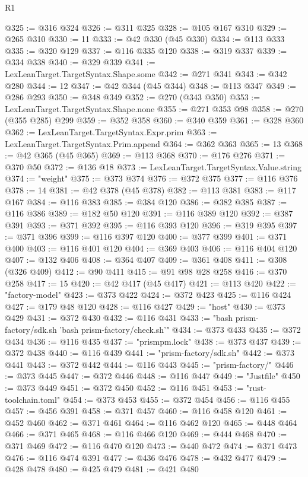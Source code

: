 \begin{lexlean}{R1}
\begin{coremodule}
@325 := @316 @324
@326 := @311 @325
@328 := @105 @167 @310
@329 := @265 @310
@330 := 11
@333 := @42 @330 (@45 @330)
@334 := @113 @333
@335 := @320 @129
@337 := @116 @335 @120
@338 := @319 @337
@339 := @334 @338
@340 := @329 @339
@341 := LexLeanTarget.TargetSyntax.Shape.some
@342 := @271 @341
@343 := @342 @280
@344 := 12
@347 := @42 @344 (@45 @344)
@348 := @113 @347
@349 := @286 @293
@350 := @348 @349
@352 := @270 (@343 @350)
@353 := LexLeanTarget.TargetSyntax.Shape.none
@355 := @271 @353 @98
@358 := @270 (@355 @285) @299
@359 := @352 @358
@360 := @340 @359
@361 := @328 @360
@362 := LexLeanTarget.TargetSyntax.Expr.prim
@363 := LexLeanTarget.TargetSyntax.Prim.append
@364 := @362 @363
@365 := 13
@368 := @42 @365 (@45 @365)
@369 := @113 @368
@370 := @176 @276
@371 := @370 @50
@372 := @136 @18
@373 := LexLeanTarget.TargetSyntax.Value.string
@374 := "weight"
@375 := @373 @374
@376 := @372 @375
@377 := @116 @376
@378 := 14
@381 := @42 @378 (@45 @378)
@382 := @113 @381
@383 := @117 @167
@384 := @116 @383
@385 := @384 @120
@386 := @382 @385
@387 := @116 @386
@389 := @182 @50 @120
@391 := @116 @389 @120
@392 := @387 @391
@393 := @371 @392
@395 := @116 @393 @120
@396 := @319 @395
@397 := @371 @396
@399 := @116 @397 @120
@400 := @377 @399
@401 := @371 @400
@403 := @116 @401 @120
@404 := @369 @403
@406 := @116 @404 @120
@407 := @132 @406
@408 := @364 @407
@409 := @361 @408
@411 := @308 (@326 @409)
@412 := @90 @411
@415 := @91 @98 @28 @258
@416 := @370 @258
@417 := 15
@420 := @42 @417 (@45 @417)
@421 := @113 @420
@422 := "factory-model"
@423 := @373 @422
@424 := @372 @423
@425 := @116 @424
@427 := @179 @48 @120
@428 := @116 @427
@429 := "host"
@430 := @373 @429
@431 := @372 @430
@432 := @116 @431
@433 := "bash prism-factory/sdk.sh 'bash prism-factory/check.sh'"
@434 := @373 @433
@435 := @372 @434
@436 := @116 @435
@437 := "prismpm.lock"
@438 := @373 @437
@439 := @372 @438
@440 := @116 @439
@441 := "prism-factory/sdk.sh"
@442 := @373 @441
@443 := @372 @442
@444 := @116 @443
@445 := "prism-factory/"
@446 := @373 @445
@447 := @372 @446
@448 := @116 @447
@449 := "Justfile"
@450 := @373 @449
@451 := @372 @450
@452 := @116 @451
@453 := "rust-toolchain.toml"
@454 := @373 @453
@455 := @372 @454
@456 := @116 @455
@457 := @456 @391
@458 := @371 @457
@460 := @116 @458 @120
@461 := @452 @460
@462 := @371 @461
@464 := @116 @462 @120
@465 := @448 @464
@466 := @371 @465
@468 := @116 @466 @120
@469 := @444 @468
@470 := @371 @469
@472 := @116 @470 @120
@473 := @440 @472
@474 := @371 @473
@476 := @116 @474 @391
@477 := @436 @476
@478 := @432 @477
@479 := @428 @478
@480 := @425 @479
@481 := @421 @480

\end{coremodule}
\end{lexlean}
